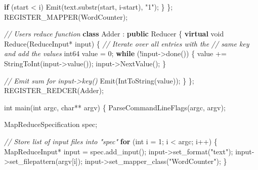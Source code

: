 \documentclass[
]{article}
\newenvironment{Shaded}{}{}
\newcommand{\CommentTok}[1]{\textcolor[rgb]{0.38,0.63,0.69}{\textit{#1}}}
\newcommand{\ControlFlowTok}[1]{\textcolor[rgb]{0.00,0.44,0.13}{\textbf{#1}}}
\newcommand{\DataTypeTok}[1]{\textcolor[rgb]{0.56,0.13,0.00}{#1}}
\newcommand{\DecValTok}[1]{\textcolor[rgb]{0.25,0.63,0.44}{#1}}
\newcommand{\KeywordTok}[1]{\textcolor[rgb]{0.00,0.44,0.13}{\textbf{#1}}}
\newcommand{\NormalTok}[1]{#1}
\newcommand{\OperatorTok}[1]{\textcolor[rgb]{0.40,0.40,0.40}{#1}}
\newcommand{\StringTok}[1]{\textcolor[rgb]{0.25,0.44,0.63}{#1}}
\begin{document}
\begin{Shaded}
\begin{Highlighting}[]
\ControlFlowTok{if} \OperatorTok{(}\NormalTok{start }\OperatorTok{\textless{}}\NormalTok{ i}\OperatorTok{)}
\NormalTok{    Emit}\OperatorTok{(}\NormalTok{text}\OperatorTok{.}\NormalTok{substr}\OperatorTok{(}\NormalTok{start}\OperatorTok{,}\NormalTok{ i}\OperatorTok{{-}}\NormalTok{start}\OperatorTok{),} \StringTok{"1"}\OperatorTok{);}
    \OperatorTok{\}}
\OperatorTok{\};}
\NormalTok{REGISTER\_MAPPER}\OperatorTok{(}\NormalTok{WordCounter}\OperatorTok{);}

\CommentTok{// User\textquotesingle{}s reduce function}
\KeywordTok{class}\NormalTok{ Adder }\OperatorTok{:} \KeywordTok{public}\NormalTok{ Reducer }\OperatorTok{\{}
    \KeywordTok{virtual} \DataTypeTok{void}\NormalTok{ Reduce}\OperatorTok{(}\NormalTok{ReduceInput}\OperatorTok{*}\NormalTok{ input}\OperatorTok{)} \OperatorTok{\{}
    \CommentTok{// Iterate over all entries with the}
    \CommentTok{// same key and add the values}
\NormalTok{    int64 value }\OperatorTok{=} \DecValTok{0}\OperatorTok{;}
    \ControlFlowTok{while} \OperatorTok{(!}\NormalTok{input}\OperatorTok{{-}\textgreater{}}\NormalTok{done}\OperatorTok{())} \OperatorTok{\{}
\NormalTok{    value }\OperatorTok{+=}\NormalTok{ StringToInt}\OperatorTok{(}\NormalTok{input}\OperatorTok{{-}\textgreater{}}\NormalTok{value}\OperatorTok{());}
\NormalTok{    input}\OperatorTok{{-}\textgreater{}}\NormalTok{NextValue}\OperatorTok{();}
    \OperatorTok{\}}

    \CommentTok{// Emit sum for input{-}\textgreater{}key()}
\NormalTok{    Emit}\OperatorTok{(}\NormalTok{IntToString}\OperatorTok{(}\NormalTok{value}\OperatorTok{));}
    \OperatorTok{\}}
\OperatorTok{\};}
\NormalTok{REGISTER\_REDCER}\OperatorTok{(}\NormalTok{Adder}\OperatorTok{);}

\DataTypeTok{int}\NormalTok{ main}\OperatorTok{(}\DataTypeTok{int}\NormalTok{ argc}\OperatorTok{,} \DataTypeTok{char}\OperatorTok{**}\NormalTok{ argv}\OperatorTok{)} \OperatorTok{\{}
\NormalTok{    ParseCommandLineFlags}\OperatorTok{(}\NormalTok{argc}\OperatorTok{,}\NormalTok{ argv}\OperatorTok{);}

\NormalTok{    MapReduceSpecification spec}\OperatorTok{;}

    \CommentTok{// Store list of input files into "spec"}
    \ControlFlowTok{for} \OperatorTok{(}\DataTypeTok{int}\NormalTok{ i }\OperatorTok{=} \DecValTok{1}\OperatorTok{;}\NormalTok{ i }\OperatorTok{\textless{}}\NormalTok{ argc}\OperatorTok{;}\NormalTok{ i}\OperatorTok{++)} \OperatorTok{\{}
\NormalTok{    MapReduceInput}\OperatorTok{*}\NormalTok{ input }\OperatorTok{=}\NormalTok{ spec}\OperatorTok{.}\NormalTok{add\_input}\OperatorTok{();}
\NormalTok{    input}\OperatorTok{{-}\textgreater{}}\NormalTok{set\_format}\OperatorTok{(}\StringTok{"text"}\OperatorTok{);}
\NormalTok{    input}\OperatorTok{{-}\textgreater{}}\NormalTok{set\_filepattern}\OperatorTok{(}\NormalTok{argv}\OperatorTok{[}\NormalTok{i}\OperatorTok{]);}
\NormalTok{    input}\OperatorTok{{-}\textgreater{}}\NormalTok{set\_mapper\_class}\OperatorTok{(}\StringTok{"WordCounter"}\OperatorTok{);}
    \OperatorTok{\}}


\end{Highlighting}
\end{Shaded}
\end{document}
